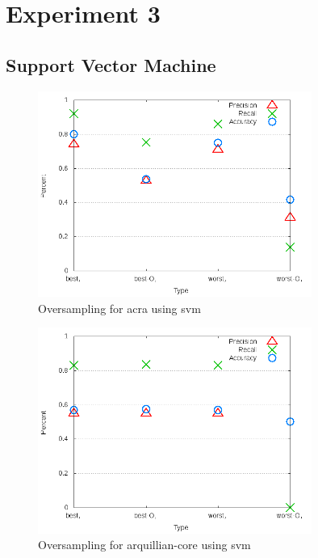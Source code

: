 \section{Experiment 3}
\label{app_sec:experiment_3}

\subsection{Support Vector Machine}
\label{app_sub:experiment_3_svm}
\clearpage

\begin{figure}
\centering
\includegraphics[width=0.8\textwidth]{images/svm/test_4/acra_sample_range.png}
\caption{Oversampling for acra using \gls{svm}}
\label{fig:test_4_acra_svm}
\end{figure}


\begin{figure}
\centering
\includegraphics[width=0.8\textwidth]{images/svm/test_4/arquillian-core_sample_range.png}
\caption{Oversampling for arquillian-core using \gls{svm}}
\label{fig:test_4_arquillian-core_svm}
\end{figure}

